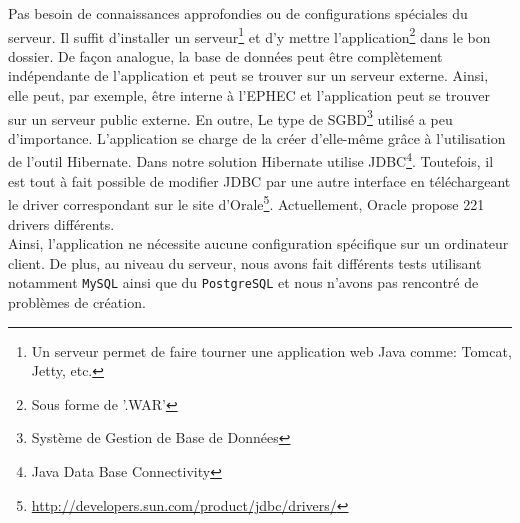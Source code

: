 Pas besoin de connaissances approfondies ou de configurations spéciales du
serveur. Il suffit d'installer un serveur\footnote{Un serveur permet
de faire tourner une application web Java comme: Tomcat, Jetty, etc.} et d'y
mettre l'application\footnote{Sous forme de '.WAR'} dans le bon dossier.
\newline
\indent
De façon analogue, la base de données peut être complètement indépendante de l'application et peut se trouver sur un serveur externe. Ainsi, elle peut, par exemple, être interne à l'EPHEC et l'application peut se trouver sur un serveur public externe. En outre, 
Le type de SGBD\footnote{Système de Gestion de Base de Données} utilisé a peu d'importance. L'application se charge de la créer d'elle-même
grâce à l'utilisation de l'outil Hibernate. Dans notre solution Hibernate utilise JDBC\footnote{Java Data Base Connectivity}.
\newline
\indent
Toutefois, il est tout à fait possible de modifier JDBC par une autre interface en téléchargeant le driver correspondant sur le site d'Orale\footnote{\url{http://developers.sun.com/product/jdbc/drivers/}}. Actuellement, Oracle propose 221 drivers différents.\\
\newline
\indent
Ainsi, l'application ne nécessite aucune configuration spécifique sur un ordinateur client. De plus, au niveau du serveur, nous avons fait différents tests utilisant notamment \texttt{MySQL} ainsi que du \texttt{PostgreSQL} et nous n'avons pas rencontré de problèmes de création.

